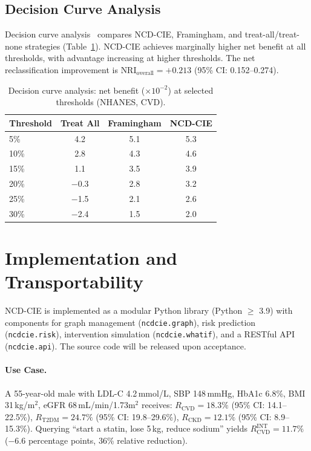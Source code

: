 \documentclass[runningheads]{llncs}
\begin{document}
\subsection{Decision Curve Analysis}\label{sec:dca}

Decision curve analysis~\cite{vickers2006dca} compares NCD-CIE,
Framingham, and treat-all/treat-none strategies
(Table~\ref{tab:dca}).  NCD-CIE achieves marginally higher net benefit
at all thresholds, with advantage increasing at higher thresholds.
The net reclassification improvement is $\text{NRI}_{\text{overall}} =
+0.213$ (95\% CI: 0.152--0.274).

\begin{table}[t]
\centering
\caption{Decision curve analysis: net benefit ($\times 10^{-2}$) at
selected thresholds (NHANES, CVD).}
\label{tab:dca}
\small
\begin{tabular}{@{}lccc@{}}
\toprule
\textbf{Threshold} & \textbf{Treat All} & \textbf{Framingham} &
\textbf{NCD-CIE} \\
\midrule
5\%  & 4.2 & 5.1 & 5.3 \\
10\% & 2.8 & 4.3 & 4.6 \\
15\% & 1.1 & 3.5 & 3.9 \\
20\% & $-$0.3 & 2.8 & 3.2 \\
25\% & $-$1.5 & 2.1 & 2.6 \\
30\% & $-$2.4 & 1.5 & 2.0 \\
\bottomrule
\end{tabular}
\end{table}

\section{Implementation and Transportability}\label{sec:impl}

NCD-CIE is implemented as a modular Python library (Python $\geq$
3.9) with components for graph management (\texttt{ncdcie.graph}),
risk prediction (\texttt{ncdcie.risk}), intervention simulation
(\texttt{ncdcie.whatif}), and a RESTful API (\texttt{ncdcie.api}).
The source code will be released upon acceptance.

\paragraph{Use Case.}
A 55-year-old male with LDL-C 4.2\,mmol/L, SBP 148\,mmHg, HbA1c
6.8\%, BMI 31\,kg/m$^2$, eGFR 68\,mL/min/1.73m$^2$ receives:
$R_{\text{CVD}} = 18.3\%$ (95\% CI: 14.1--22.5\%),
$R_{\text{T2DM}} = 24.7\%$ (95\% CI: 19.8--29.6\%),
$R_{\text{CKD}} = 12.1\%$ (95\% CI: 8.9--15.3\%).
Querying ``start a statin, lose 5\,kg, reduce sodium'' yields
$R_{\text{CVD}}^{\text{INT}} = 11.7\%$ ($-$6.6 percentage points,
36\% relative reduction).
\end{document}
